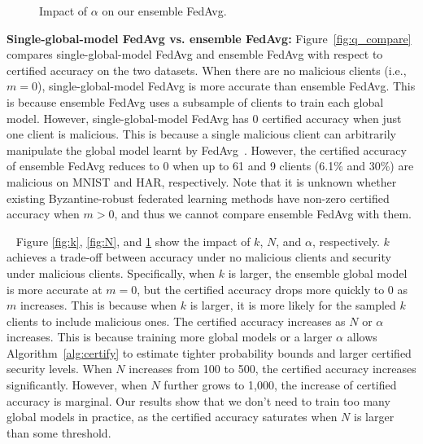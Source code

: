 \documentclass[letterpaper]{article} %
\newcommand{\myparatight}[1]{\smallskip\noindent{\bf {#1}:}~}
\begin{document}
\begin{figure}[!t]
\center
{}
\caption{Impact of $\alpha$ on our ensemble FedAvg.}
\label{fig:alpha}
\end{figure}

\noindent
{\bf Single-global-model FedAvg vs. ensemble FedAvg:} Figure~\ref{fig:q_compare} compares single-global-model FedAvg and ensemble FedAvg with respect to certified accuracy on the two datasets.
When there are no malicious clients (i.e., $m=0$), single-global-model FedAvg is more accurate than ensemble FedAvg. This is because ensemble FedAvg uses a subsample of clients to train each global model.
However, single-global-model FedAvg has 0 certified accuracy when just one client is malicious. This is because a single malicious client can arbitrarily manipulate the global model learnt by FedAvg~\cite{Blanchard17}. However, the certified accuracy of ensemble FedAvg reduces to 0 when up to 61 and 9 clients (6.1\% and 30\%) are malicious on MNIST and HAR, respectively. Note that it is unknown whether existing Byzantine-robust federated learning methods have non-zero certified accuracy when $m>0$, and thus we cannot compare ensemble FedAvg with them.

\myparatight{Impact of $k$, $N$, and $\alpha$} Figure \ref{fig:k}, \ref{fig:N}, and  \ref{fig:alpha} show the impact of $k$, $N$, and $\alpha$, respectively. $k$ achieves a trade-off between accuracy under no malicious clients and security under malicious clients.
Specifically, when $k$ is larger, the ensemble global model is more accurate at $m=0$, but the certified accuracy drops more quickly to 0 as $m$ increases. This is because when $k$ is larger, it is more likely for the sampled $k$ clients to include malicious ones.
The certified accuracy increases as $N$ or $\alpha$ increases. This is because training more global models or a larger $\alpha$ allows Algorithm~\ref{alg:certify} to estimate tighter probability bounds and larger certified security levels. When $N$ increases from 100 to 500,  the certified accuracy increases significantly. However, when $N$ further grows to 1,000, the increase of certified accuracy is marginal. Our results show that  we don't need to train too many global models in practice, as the certified accuracy saturates when $N$ is larger than some threshold.
\end{document}
